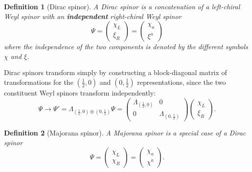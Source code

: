 \documentclass[11pt]{article}
\numberwithin{equation}{section}
\newtheorem{defn}{Definition}[section]
\begin{document}
\begin{defn}[Dirac spinor]
A Dirac spinor is a concatenation of a left-chiral Weyl spinor with an \textbf{independent} right-chiral Weyl spinor
\begin{equation}
\Psi = \begin{pmatrix}
\chi_L \\
\xi_R
\end{pmatrix} = 
\begin{pmatrix}
\chi_a \\
\xi^{\dot{a}}
\end{pmatrix}
\end{equation}
where the independence of the two components is denoted by the different symbols $\chi$ and $\xi$.
\end{defn}

Dirac spinors transform simply by constructing a block-diagonal matrix of transformations for the $(\frac{1}{2},0)$ and $(0, \frac{1}{2})$ representations, since the two constituent Weyl spinors transform independently:
\begin{equation}
\Psi \rightarrow \Psi' = \Lambda_{(\frac{1}{2},0) \oplus (0, \frac{1}{2})} \Psi = \begin{pmatrix}
\Lambda_{(\frac{1}{2},0)} & 0 \\
0 & \Lambda_{(0, \frac{1}{2})} 
\end{pmatrix} \begin{pmatrix}
\chi_L \\
\xi_R
\end{pmatrix}.
\end{equation}

\begin{defn}[Majorana spinor]
A Majorana spinor is a special case of a Dirac spinor
\begin{equation}
\Psi = \begin{pmatrix}
\chi_L \\
\chi_R
\end{pmatrix} = 
\begin{pmatrix}
\chi_a \\
\chi^{\dot{a}}
\end{pmatrix}.
\end{equation}
\end{defn}
\end{document}
